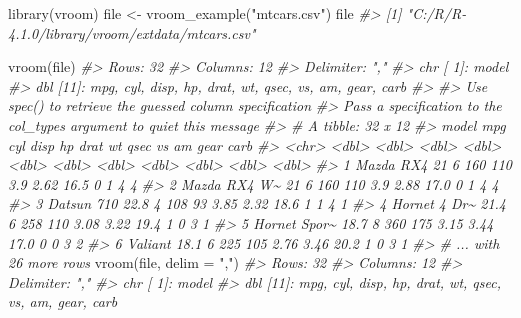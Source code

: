 \documentclass[
]{book}
\newenvironment{Shaded}{\begin{snugshade}}{\end{snugshade}}
\newcommand{\AttributeTok}[1]{\textcolor[rgb]{0.77,0.63,0.00}{#1}}
\newcommand{\CommentTok}[1]{\textcolor[rgb]{0.56,0.35,0.01}{\textit{#1}}}
\newcommand{\FunctionTok}[1]{\textcolor[rgb]{0.00,0.00,0.00}{#1}}
\newcommand{\NormalTok}[1]{#1}
\newcommand{\OtherTok}[1]{\textcolor[rgb]{0.56,0.35,0.01}{#1}}
\newcommand{\StringTok}[1]{\textcolor[rgb]{0.31,0.60,0.02}{#1}}
\begin{document}
\begin{Shaded}
\begin{Highlighting}[]
\FunctionTok{library}\NormalTok{(vroom)}
\NormalTok{file }\OtherTok{\textless{}{-}} \FunctionTok{vroom\_example}\NormalTok{(}\StringTok{"mtcars.csv"}\NormalTok{)}
\NormalTok{file}
\CommentTok{\#\textgreater{} [1] "C:/R/R{-}4.1.0/library/vroom/extdata/mtcars.csv"}

\FunctionTok{vroom}\NormalTok{(file)}
\CommentTok{\#\textgreater{} Rows: 32}
\CommentTok{\#\textgreater{} Columns: 12}
\CommentTok{\#\textgreater{} Delimiter: ","}
\CommentTok{\#\textgreater{} chr [ 1]: model}
\CommentTok{\#\textgreater{} dbl [11]: mpg, cyl, disp, hp, drat, wt, qsec, vs, am, gear, carb}
\CommentTok{\#\textgreater{} }
\CommentTok{\#\textgreater{} Use \textasciigrave{}spec()\textasciigrave{} to retrieve the guessed column specification}
\CommentTok{\#\textgreater{} Pass a specification to the \textasciigrave{}col\_types\textasciigrave{} argument to quiet this message}
\CommentTok{\#\textgreater{} \# A tibble: 32 x 12}
\CommentTok{\#\textgreater{}   model          mpg   cyl  disp    hp  drat    wt  qsec    vs    am  gear  carb}
\CommentTok{\#\textgreater{}   \textless{}chr\textgreater{}        \textless{}dbl\textgreater{} \textless{}dbl\textgreater{} \textless{}dbl\textgreater{} \textless{}dbl\textgreater{} \textless{}dbl\textgreater{} \textless{}dbl\textgreater{} \textless{}dbl\textgreater{} \textless{}dbl\textgreater{} \textless{}dbl\textgreater{} \textless{}dbl\textgreater{} \textless{}dbl\textgreater{}}
\CommentTok{\#\textgreater{} 1 Mazda RX4     21       6   160   110  3.9   2.62  16.5     0     1     4     4}
\CommentTok{\#\textgreater{} 2 Mazda RX4 W\textasciitilde{}  21       6   160   110  3.9   2.88  17.0     0     1     4     4}
\CommentTok{\#\textgreater{} 3 Datsun 710    22.8     4   108    93  3.85  2.32  18.6     1     1     4     1}
\CommentTok{\#\textgreater{} 4 Hornet 4 Dr\textasciitilde{}  21.4     6   258   110  3.08  3.22  19.4     1     0     3     1}
\CommentTok{\#\textgreater{} 5 Hornet Spor\textasciitilde{}  18.7     8   360   175  3.15  3.44  17.0     0     0     3     2}
\CommentTok{\#\textgreater{} 6 Valiant       18.1     6   225   105  2.76  3.46  20.2     1     0     3     1}
\CommentTok{\#\textgreater{} \# ... with 26 more rows}
\FunctionTok{vroom}\NormalTok{(file, }\AttributeTok{delim =} \StringTok{","}\NormalTok{)}
\CommentTok{\#\textgreater{} Rows: 32}
\CommentTok{\#\textgreater{} Columns: 12}
\CommentTok{\#\textgreater{} Delimiter: ","}
\CommentTok{\#\textgreater{} chr [ 1]: model}
\CommentTok{\#\textgreater{} dbl [11]: mpg, cyl, disp, hp, drat, wt, qsec, vs, am, gear, carb}

\end{Highlighting}
\end{Shaded}
\end{document}
